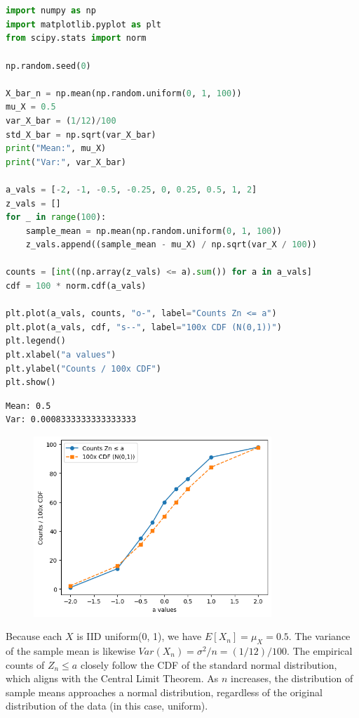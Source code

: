 \documentclass[11pt,a4paper,margin=1in]{article}
\begin{document}
\section{}
\begin{lstlisting}[language=python]
import numpy as np
import matplotlib.pyplot as plt
from scipy.stats import norm

np.random.seed(0)

X_bar_n = np.mean(np.random.uniform(0, 1, 100))
mu_X = 0.5
var_X_bar = (1/12)/100
std_X_bar = np.sqrt(var_X_bar)
print("Mean:", mu_X)
print("Var:", var_X_bar)

a_vals = [-2, -1, -0.5, -0.25, 0, 0.25, 0.5, 1, 2]
z_vals = []
for _ in range(100):
    sample_mean = np.mean(np.random.uniform(0, 1, 100))
    z_vals.append((sample_mean - mu_X) / np.sqrt(var_X / 100))

counts = [int((np.array(z_vals) <= a).sum()) for a in a_vals]
cdf = 100 * norm.cdf(a_vals)

plt.plot(a_vals, counts, "o-", label="Counts Zn <= a")
plt.plot(a_vals, cdf, "s--", label="100x CDF (N(0,1))")
plt.legend()
plt.xlabel("a values")
plt.ylabel("Counts / 100x CDF")
plt.show()
\end{lstlisting}
\begin{verbatim}
Mean: 0.5
Var: 0.0008333333333333333
\end{verbatim}
\begin{figure}[H]
    \centering
    \includegraphics[width=0.8\textwidth]{3.png}
\end{figure}
    \noindent Because each $X$ is IID uniform(0, 1), we have $E[X_n] = \mu_X = 0.5$.
    The variance of the sample mean is likewise $Var(X_n) = \sigma^2 / n = (1/12) / 100$.
    The empirical counts of $Z_n \leq a$ closely follow the CDF of the standard normal
    distribution, which aligns with the Central Limit Theorem. As $n$ increases, the distribution
    of sample means approaches a normal distribution, regardless of the original distribution
    of the data (in this case, uniform). 
\end{document}
